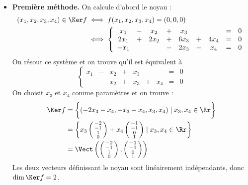 \documentclass[class=report,crop=false]{standalone}
\begin{document}
\begin{exemple}
 \begin{itemize}
  \item \textbf{Première méthode.}
  On calcule d'abord le noyau :
  \begin{align*}
  (x_1,x_2,x_3,x_4) \in \Ker f &\iff f(x_1,x_2,x_3,x_4) = (0,0,0) \\
  &\iff \left\{
  \begin{array}{cccccccccc}
   x_1  &-& x_2  &+& x_3  & &      &=& 0 \\
   2x_1 &+& 2x_2 &+& 6x_3 &+& 4x_4 &=& 0 \\
   -x_1 & &      &-& 2x_3 &-& x_4  &=& 0
  \end{array}\right.\end{align*}
  On résout ce système et on trouve qu'il est équivalent
  à $$\left\{
  \begin{array}{cccccccccc}
   x_1  &-& x_2  &+& x_3  & &      &=& 0 \\
        & & x_2  &+& x_3  &+& x_4  &=& 0
  \end{array}  \right.$$
  On choisit $x_3$ et $x_4$ comme paramètres et on trouve :
  \begin{align*}
  \Ker f 
  & = \bigg\{ (-2x_3-x_4,-x_3-x_4,x_3,x_4) \mid x_3,x_4 \in \Rr\bigg\}\\
  & = \left\{ x_3 \left(\begin{smallmatrix}-2 \\-1 \\1 \\0 \end{smallmatrix}\right)
  + x_4 \left(\begin{smallmatrix}-1\\-1\\0\\1 \end{smallmatrix}\right)\mid x_3,x_4 \in \Rr \right\}\\
  & = \Vect \left( \left(\begin{smallmatrix}-2 \\-1 \\1 \\0 \end{smallmatrix}\right),
  \left(\begin{smallmatrix}-1\\-1\\0\\1 \end{smallmatrix}\right)
  \right)
  \end{align*}
  Les deux vecteurs définissant le noyau sont linéairement indépendants, donc
  $\dim \Ker f = 2$.


\end{itemize}
\end{exemple}
\end{document}
